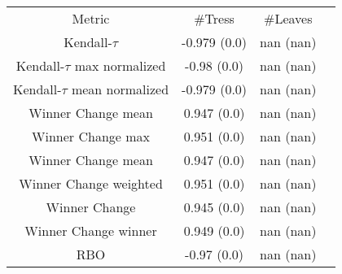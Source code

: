 \begin{tabular}{c|c|c|c} 
Metric & #Tress & #Leaves \\ 
Kendall-$\tau$ & -0.979 (0.0) & nan (nan)   \\ 
Kendall-$\tau$ max normalized & -0.98 (0.0) & nan (nan)   \\ 
Kendall-$\tau$ mean normalized & -0.979 (0.0) & nan (nan)   \\ 
Winner Change mean& 0.947 (0.0) & nan (nan)   \\ 
Winner Change max & 0.951 (0.0) & nan (nan)   \\ 
Winner Change mean & 0.947 (0.0) & nan (nan)   \\ 
Winner Change weighted & 0.951 (0.0) & nan (nan)   \\ 
Winner Change & 0.945 (0.0) & nan (nan)   \\ 
Winner Change winner & 0.949 (0.0) & nan (nan)   \\ 
RBO & -0.97 (0.0) & nan (nan)   \\ 
\end{tabular}